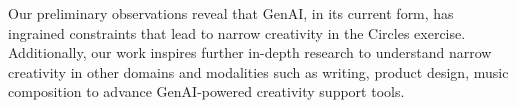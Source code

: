 Our preliminary observations reveal that GenAI, in its current form, has ingrained constraints that lead to narrow creativity in the Circles exercise. 
Additionally, our work inspires further in-depth research to understand narrow creativity in other domains and modalities such as writing, product design, music composition to advance GenAI-powered creativity support tools.
